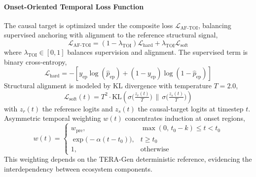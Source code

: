 \documentclass[a4paper,fleqn]{cas-dc}
\newcommand{\TERAGen}{\mbox{TERA-Gen}\xspace}
\begin{document}
\paragraph{Onset-Oriented Temporal Loss Function}
The causal target is optimized under the composite loss
$\mathcal{L}_{\mathrm{AF\text{-}TOI}}$, balancing supervised anchoring with
alignment to the reference structural signal,
\begin{equation}
  \mathcal{L}_{\mathrm{AF\text{-}TOI}} = (1-\lambda_{\mathrm{TOI}})
    \mathcal{L}_{\text{hard}} + \lambda_{\mathrm{TOI}} \mathcal{L}_{\text{soft}}
  \label{eq:perda_total_aftoi}
\end{equation}
where $\lambda_{\mathrm{TOI}} \in [0,1]$ balances supervision and alignment. The
supervised term is binary cross-entropy,
\begin{equation}
  \mathcal{L}_{\text{hard}} = - \left[ y_{\text{ep}}\log(\hat{p}_{\text{ep}})
    + (1 - y_{\text{ep}}) \log(1 - \hat{p}_{\text{ep}}) \right]
  \label{eq:perda_hard_aftoi}
\end{equation}
Structural alignment is modeled by KL divergence with temperature $T=2.0$,
\begin{equation}
  \mathcal{L}_{\text{soft}}(t) = T^2 \cdot \mathrm{KL}\!\left(
    \sigma\!\bigl(\tfrac{z_r(t)}{T}\bigr) \,\Big\|\,
    \sigma\!\bigl(\tfrac{z_s(t)}{T}\bigr) \right)
  \label{eq:perda_soft_aftoi}
\end{equation}
with $z_r(t)$ the reference logits and $z_s(t)$ the causal-target logits at
timestep $t$. Asymmetric temporal weighting $w(t)$ concentrates induction at
onset regions,
\begin{equation}
w(t)= \begin{cases}
w_{\text{pre}}, & \max(0,\,t_0-k) \le t < t_0 \\[4pt]
\exp\!\bigl(-\alpha (t-t_0)\bigr), & t \ge t_0 \\[4pt]
1, & \text{otherwise}
\end{cases}
\label{eq:ponderacao_aftoi}
\end{equation}
This weighting depends on the \TERAGen deterministic reference, evidencing the interdependency between ecosystem components.
\end{document}
